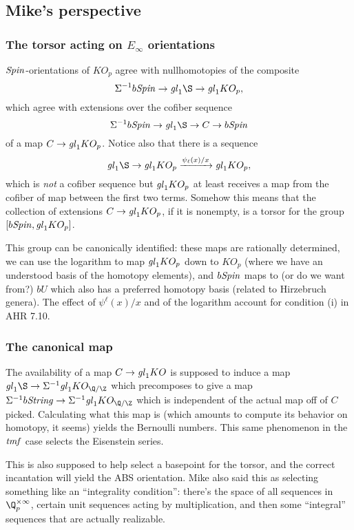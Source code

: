 \subsection{Mike's perspective}

\subsubsection{The torsor acting on $E_\infty$ orientations}
$\mathit{Spin}$-orientations of $KO_p$ agree with nullhomotopies of the composite \[\Susp^{-1} b\Spin \to \gl_1 \S \to \gl_1 KO_p,\] which agree with extensions over the cofiber sequence \[\Susp^{-1} b\Spin \to \gl_1 \S \to C \to b\Spin\] of a map $C \to \mathit{gl}_1 KO_p$.  Notice also that there is a sequence \[\gl_1 \S \to \gl_1 KO_p \xrightarrow{\psi_\ell(x) / x} \gl_1 KO_p,\] which is \emph{not} a cofiber sequence but $\mathit{gl}_1 KO_p$ at least receives a map from the cofiber of map between the first two terms.  Somehow this means that the collection of extensions $C \to \mathit{gl}_1 KO_p$, if it is nonempty, is a torsor for the group $[b\mathit{Spin}, \mathit{gl}_1 KO_p]$.

This group can be canonically identified: these maps are rationally determined, we can use the logarithm to map $\mathit{gl}_1 KO_p$ down to $KO_p$ (where we have an understood basis of the homotopy elements), and $b\mathit{Spin}$ maps to (or do we want from?) $bU$ which also has a preferred homotopy basis (related to Hirzebruch genera). The effect of $\psi^\ell(x) / x$ and of the logarithm account for condition (i) in AHR 7.10.

\subsubsection{The canonical map}
The availability of a map $C \to \mathit{gl}_1 KO$ is supposed to induce a map $\gl_1 \S \to \Susp^{-1} \gl_1 KO_{\Q/\Z}$ which precomposes to give a map $\Susp^{-1} b\String \to \Susp^{-1} \gl_1 KO_{\Q/\Z}$ which is independent of the actual map off of $C$ picked.  Calculating what this map is (which amounts to compute its behavior on homotopy, it seems) yields the Bernoulli numbers. This same phenomenon in the $\mathit{tmf}$ case selects the Eisenstein series.

This is also supposed to help select a basepoint for the torsor, and the correct incantation will yield the ABS orientation.  Mike also said this as selecting something like an ``integrality condition'': there's the space of all sequences in $\Q_p^{\times \infty}$, certain unit sequences acting by multiplication, and then some ``integral'' sequences that are actually realizable.

